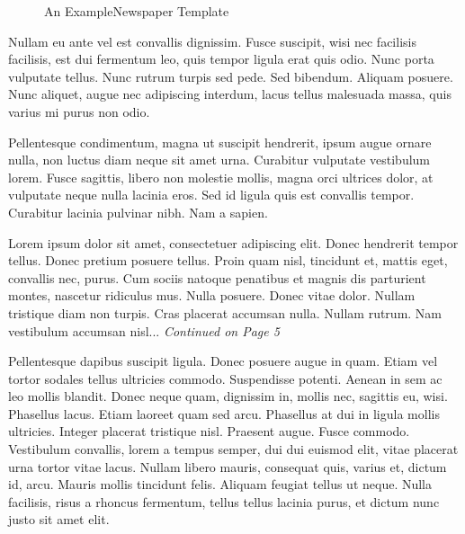 \documentclass{article}
\date{2000 3 2}
\begin{document}
\maketitle

\begin{figure*}[h]
  \begin{center}
    \fontsize{40}{1.5cm}\selectfont
    An ExampleNewspaper Template
    \hfill
    \end{center}
\end{figure*}


\begin{multicols}{3}{



\begin{window}
  Nullam eu ante vel est convallis dignissim.  Fusce suscipit, wisi
  nec facilisis facilisis, est dui fermentum leo, quis tempor ligula
  erat quis odio.  Nunc porta vulputate tellus.  Nunc rutrum turpis
  sed pede.  Sed bibendum.  Aliquam posuere.  Nunc aliquet, augue nec
  adipiscing interdum, lacus tellus malesuada massa, quis varius mi
  purus non odio.

  Pellentesque condimentum, magna ut suscipit hendrerit, ipsum augue
  ornare nulla, non luctus diam neque sit amet urna.  Curabitur
  vulputate vestibulum lorem.  Fusce sagittis, libero non molestie
  mollis, magna orci ultrices dolor, at vulputate neque nulla lacinia
  eros.  Sed id ligula quis est convallis tempor.  Curabitur lacinia
  pulvinar nibh.  Nam a sapien.
\end{window}
\par
{}


Lorem ipsum dolor sit amet, consectetuer adipiscing elit.  Donec
hendrerit tempor tellus.  Donec pretium posuere tellus.  Proin quam
nisl, tincidunt et, mattis eget, convallis nec, purus.  Cum sociis
natoque penatibus et magnis dis parturient montes, nascetur ridiculus
mus.  Nulla posuere.  Donec vitae dolor.  Nullam tristique diam non
turpis.  Cras placerat accumsan nulla.  Nullam rutrum.  Nam vestibulum
accumsan nisl... \emph{Continued on Page 5}

\closearticle



Pellentesque dapibus suscipit ligula.  Donec posuere augue in quam.
Etiam vel tortor sodales tellus ultricies commodo.  Suspendisse
potenti.  Aenean in sem ac leo mollis blandit.  Donec neque quam,
dignissim in, mollis nec, sagittis eu, wisi.  Phasellus lacus.  Etiam
laoreet quam sed arcu.  Phasellus at dui in ligula mollis ultricies.
Integer placerat tristique nisl.  Praesent augue.  Fusce commodo.
Vestibulum convallis, lorem a tempus semper, dui dui euismod elit,
vitae placerat urna tortor vitae lacus.  Nullam libero mauris,
consequat quis, varius et, dictum id, arcu.  Mauris mollis tincidunt
felis.  Aliquam feugiat tellus ut neque.  Nulla facilisis, risus a
rhoncus fermentum, tellus tellus lacinia purus, et dictum nunc justo
sit amet elit.

}
\end{multicols}
\end{document}
